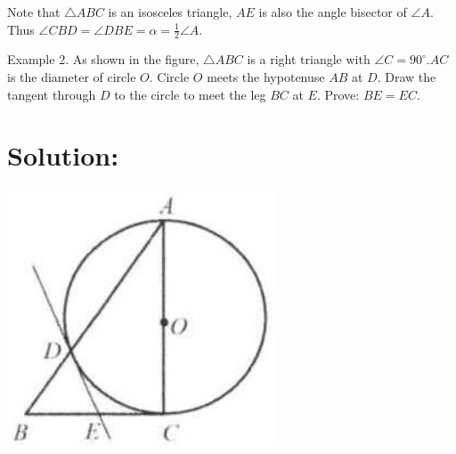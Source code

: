 \documentclass[10pt]{article}
\begin{document}
Note that \(\triangle A B C\) is an isosceles triangle, \(A E\) is also the angle bisector of \(\angle A\).\\
Thus \(\angle C B D=\angle D B E=\alpha=\frac{1}{2} \angle A\).

Example 2. As shown in the figure, \(\triangle A B C\) is a right triangle with \(\angle C=90^{\circ} . A C\) is the diameter of circle \(O\). Circle \(O\) meets the hypotenuse \(A B\) at \(D\). Draw the tangent through \(D\) to the circle to meet the leg \(B C\) at \(E\). Prove: \(B E=E C\).

\section*{Solution:}
\begin{center}
\includegraphics[max width=\textwidth]{2025_04_17_97bc1f7e44d93c271a88g-194(3)}
\end{center}
\end{document}
